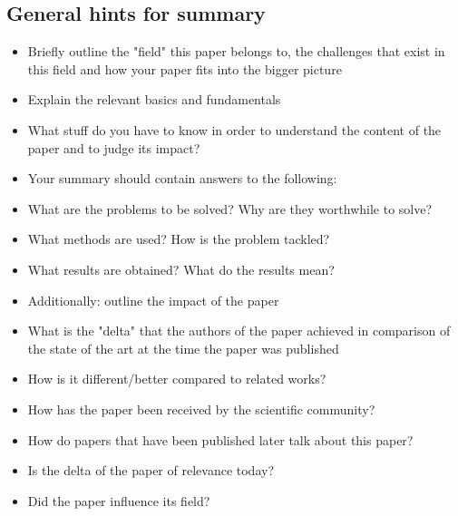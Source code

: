 \subsection{General hints for summary}

\begin{itemize}
\item Briefly outline the "field" this paper belongs to, the challenges that exist in this field and how your paper fits into the bigger picture
 \item Explain the relevant basics and fundamentals
   \item What stuff do you have to know in order to understand the content of the paper and to judge its impact?
 \item Your summary should contain answers to the following:
   \item What are the problems to be solved? Why are they worthwhile to solve?
   \item What methods are used? How is the problem tackled?
   \item What results are obtained? What do the results mean?
 \item Additionally: outline the impact of the paper
   \item What is the "delta" that the authors of the paper achieved in comparison of the state of the art at the time the paper was published
   \item How is it different/better compared to related works?
     \item How has the paper been received by the scientific community?
     \item How do papers that have been published later talk about this paper?
     \item Is the delta of the paper of relevance today?
     \item Did the paper influence its field?
\end{itemize}

